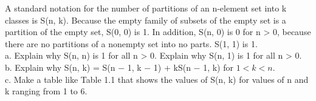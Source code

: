 \documentclass[a4paper, justified]{tufte-handout}
\begin{document}
\begin{problem}[CS 1.5-12]
A standard notation for the number of partitions of an n-element set into k classes is S(n, k). Because the empty family of subsets of the empty set is a partition of the empty set, S(0, 0) is 1. In addition, S(n, 0) is 0 for n > 0, because there are no partitions of a nonempty set into no parts. S(1, 1) is 1.\\
a. Explain why S(n, n) is 1 for all n > 0. Explain why S(n, 1) is 1 for all n > 0.\\
b. Explain why S(n, k) = S(n − 1, k − 1) + kS(n − 1, k) for $1 <k<n$.\\
c. Make a table like Table 1.1 that shows the values of S(n, k) for values of n and k ranging from 1 to 6.\\
\end{problem}
\end{document}

